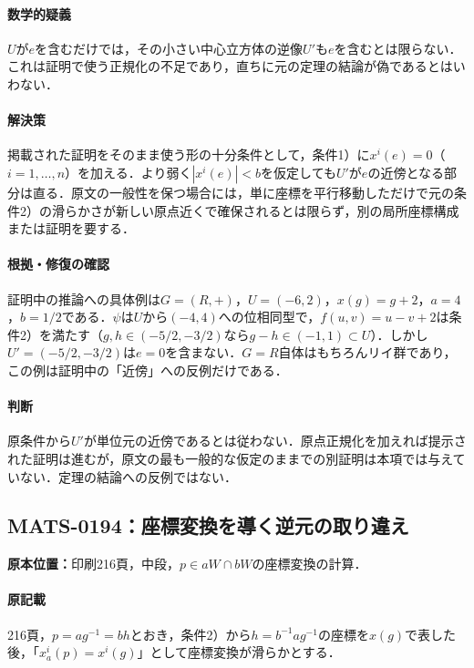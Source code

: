 \documentclass[a4paper,10pt]{ltjsarticle}
\begin{document}
\paragraph{数学的疑義}$U$が$e$を含むだけでは，その小さい中心立方体の逆像$U\prime$も$e$を含むとは限らない．これは証明で使う正規化の不足であり，直ちに元の定理の結論が偽であるとはいわない．

\paragraph{解決策}掲載された証明をそのまま使う形の十分条件として，条件1）に$x^i(e)=0$（$i=1,\ldots,n$）を加える．より弱く$|x^i(e)|<b$を仮定しても$U\prime$が$e$の近傍となる部分は直る．原文の一般性を保つ場合には，単に座標を平行移動しただけで元の条件2）の滑らかさが新しい原点近くで確保されるとは限らず，別の局所座標構成または証明を要する．

\paragraph{根拠・修復の確認}証明中の推論への具体例は$G=(R,+)$，$U=(-6,2)$，$x(g)=g+2$，$a=4$，$b=1/2$である．$\psi$は$U$から$(-4,4)$への位相同型で，$f(u,v)=u-v+2$は条件2）を満たす（$g,h\in(-5/2,-3/2)$なら$g-h\in(-1,1)\subset U$）．しかし$U\prime=(-5/2,-3/2)$は$e=0$を含まない．$G=R$自体はもちろんリイ群であり，この例は証明中の「近傍」への反例だけである．

\paragraph{判断}原条件から$U\prime$が単位元の近傍であるとは従わない．原点正規化を加えれば提示された証明は進むが，原文の最も一般的な仮定のままでの別証明は本項では与えていない．定理の結論への反例ではない．


\subsection*{MATS-0194：座標変換を導く逆元の取り違え}\label{math:MATS-0194}
\noindent\textbf{原本位置：}印刷216頁，中段，$p\in aW\cap bW$の座標変換の計算．

\paragraph{原記載}216頁，$p=ag^{-1}=bh$とおき，条件2）から$h=b^{-1}ag^{-1}$の座標を$x(g)$で表した後，「$x_a^i(p)=x^i(g)$」として座標変換が滑らかとする．
\end{document}
